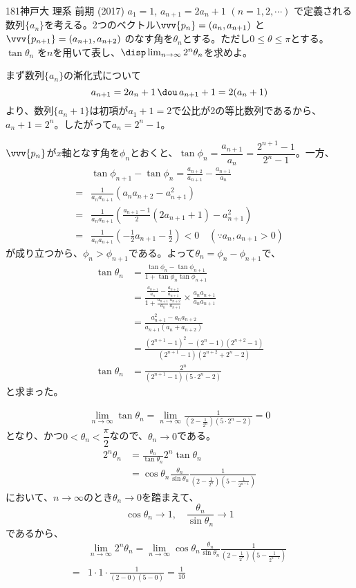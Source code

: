 \begin{thm}{181}{}{神戸大 理系 前期 (2017)}
 $a_1=1$, $a_{n+1}=2a_n+1$ $(n=1, 2, \cdots)$ で定義される数列$\{a_n\}$を考える。2つのベクトル$\vvv{p_n}=(a_n, a_{n+1})$ と$\vvv{p_{n+1}}=(a_{n+1},a_{n+2})$ のなす角を$\theta_n$とする。ただし$0\le\theta\le\pi$とする。$\tan\theta_n$ を$n$を用いて表し、$\disp \lim_{n\to\infty}2^n\theta_n$を求めよ。
\end{thm}

まず数列$\{a_n\}$の漸化式について
\[ a_{n+1}=2a_n+1 \,\dou\, a_{n+1}+1=2(a_n+1) \]
より、数列$\{a_n+1\}$は初項が$a_1+1=2$で公比が2の等比数列であるから、$a_n+1=2^n$。したがって$a_n=2^n-1$。

$\vvv{p_n}$が$x$軸となす角を$\phi_n$とおくと、$\tan\phi_n=\dfrac{a_{n+1}}{a_n}=\dfrac{2^{n+1}-1}{2^n-1}$。一方、
\begin{align*}
 &\tan\phi_{n+1}-\tan\phi_n=\frac{a_{n+2}}{a_{n+1}}-\frac{a_{n+1}}{a_n} \\
 =&\frac{1}{a_na_{n+1}}(a_na_{n+2}-a_{n+1}^2) \\
 =&\frac{1}{a_na_{n+1}}\left(\frac{a_{n+1}-1}{2}(2a_{n+1}+1)-a_{n+1}^2\right) \\
 =&\frac{1}{a_na_{n+1}}\left(-\frac{1}{2}a_{n+1}-\frac{1}{2}\right) < 0 \quad (\because a_n, a_{n+1}>0)
\end{align*}
が成り立つから、$\phi_n>\phi_{n+1}$である。よって$\theta_n=\phi_n-\phi_{n+1}$で、
\begin{align*}
 \tan\theta_n&=\frac{\tan\phi_n-\tan\phi_{n+1}}{1+\tan\phi_n\tan\phi_{n+1}} \\
 &=\frac{\frac{a_{n+1}}{a_n}-\frac{a_{n+2}}{a_{n+1}}}{1+\frac{a_{n+1}}{a_n}\frac{a_{n+2}}{a_{n+1}}}\times\frac{a_na_{n+1}}{a_na_{n+1}} \\
 &=\frac{a_{n+1}^2-a_na_{n+2}}{a_{n+1}(a_n+a_{n+2})} \\
 &=\frac{(2^{n+1}-1)^2-(2^n-1)(2^{n+2}-1)}{(2^{n+1}-1)(2^{n+2}+2^n-2)} \\
 \tan\theta_n&=\frac{2^n}{(2^{n+1}-1)(5\cdot 2^n-2)}
\end{align*}
と求まった。

\begin{align*}
 \lim_{n\to\infty} \tan\theta_n=\lim_{n\to\infty} \frac{1}{\left(2-\frac{1}{2^n}\right)(5\cdot2^n-2)}=0
\end{align*}
となり、かつ$0<\theta_n<\dfrac{\pi}{2}$なので、$\theta_n\to 0$である。
\begin{align*}
 2^n\theta_n&=\frac{\theta_n}{\tan\theta_n}2^n\tan\theta_n \\
 &=\cos\theta_n\frac{\theta_n}{\sin\theta_n}\frac{1}{\left(2-\frac{1}{2^n}\right)\left(5-\frac{1}{2^{n-1}}\right)}
\end{align*}
において、$n\to\infty$のとき$\theta_n\to 0$を踏まえて、
\[ \cos\theta_n\to 1,\quad \frac{\theta_n}{\sin\theta_n}\to 1 \]
であるから、
\begin{align*}
 &\lim_{n\to\infty} 2^n\theta_n = \lim_{n\to\infty} \cos\theta_n\frac{\theta_n}{\sin\theta_n}\frac{1}{\left(2-\frac{1}{2^n}\right)\left(5-\frac{1}{2^{n-1}}\right)} \\
 =& 1\cdot 1\cdot \frac{1}{(2-0) (5-0)}=\frac{1}{10}
\end{align*}

